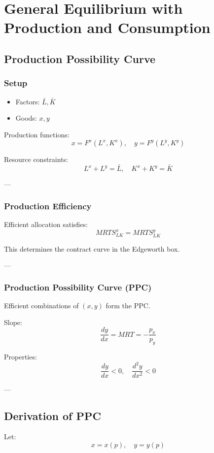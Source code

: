 \chapter{General Equilibrium with Production and Consumption}

\section{Production Possibility Curve}

\subsection{Setup}

\begin{itemize}
    \item Factors: $\bar{L}, \bar{K}$
    \item Goods: $x, y$
\end{itemize}

Production functions:
\[
x = F^x(L^x, K^x), \quad
y = F^y(L^y, K^y)
\]

Resource constraints:
\[
L^x + L^y = \bar{L}, \quad
K^x + K^y = \bar{K}
\]

---

\subsection{Production Efficiency}

Efficient allocation satisfies:
\[
MRTS^x_{LK} = MRTS^y_{LK}
\]

This determines the contract curve in the Edgeworth box.

---

\subsection{Production Possibility Curve (PPC)}

Efficient combinations of $(x,y)$ form the PPC.

Slope:
\[
\frac{dy}{dx} = MRT = -\frac{p_x}{p_y}
\]

Properties:
\[
\frac{dy}{dx} < 0, \quad \frac{d^2 y}{dx^2} < 0
\]

---

\section{Derivation of PPC}

Let:
\[
x = x(p), \quad y = y(p)
\]

